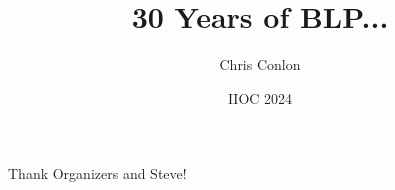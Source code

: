 

\usepackage{lipsum}
\usepackage{amsmath} 
\usepackage{amsthm} 
\usepackage{amssymb} 
\usepackage{mathtools}
\usepackage{dutchcal}
\usepackage{stackengine}


\newcommand{\vect}[1]{\symbf{\symbf{#1}}}
\newcommand{\pd}[2]{\frac{\partial{#1}}{\partial{#2}}}
\newcommand{\expect}[2]{\mathbb{E}_{#1}\left[{#2}\right]}
\newcommand{\expectsmall}[2]{\mathbb{E}_{#1}{#2}}
\newcommand{\expectsuper}[3]{\mathbb{E}_{#1}^{#2}\left[{#3}\right]}
\newcommand{\ind}[1]{\mathbbm{1}\left\{{#1}\right\}}
\newcommand{\prob}[1]{\mathbb{P}\left\{{#1}\right\}}
\newcommand{\derivative}[2]{\frac{d{#2}}{d{#1}}}
\newcommand{\cat}[1]{\citeasnoun{#1}}

\stackMath
\newlength\matfield
\newlength\tmplength
\def\matscale{1.}
\newcommand\dimbox[3]{%
  \setlength\matfield{\matscale\baselineskip}%
  \setbox0=\hbox{\vphantom{X}\smash{#3}}%
  \setlength{\tmplength}{#1\matfield-\ht0-\dp0}%
  \fboxrule=1pt\fboxsep=-\fboxrule\relax%
  \fbox{\makebox[#2\matfield]{\addstackgap[.5\tmplength]{\box0}}}%
}
\newcommand\raiserows[2]{%
   \setlength\matfield{\matscale\baselineskip}%
   \raisebox{#1\matfield}{#2}%
}
\newcommand\matbox[5]{
  \stackunder{\dimbox{#1}{#2}{$\symbf{#5}$}}{\scriptstyle(#3\times #4)}%
}



\title{30 Years of BLP...}
\author{Chris Conlon}

\date{IIOC 2024}








\begin{frame}[plain] %
\titlepage
\end{frame}



\begin{frame}{}
Thank Organizers and Steve!
\end{frame}


